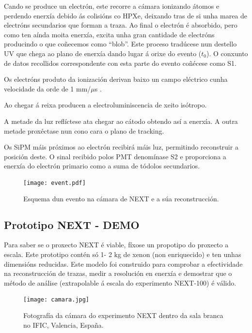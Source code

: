 \documentclass[a4paper,12pt]{article}
\begin{document}
\bi
\item Cando se produce un electrón, este recorre a cámara ionizando átomos e perdendo enerxía debido ás colisións co HPXe, deixando tras de si unha marea de electróns secundarios que forman a traza. Ao final o electrón é absorbido, pero como ten aínda moita enerxía, excita unha gran cantidade de electróns producindo o que coñecemos como ``blob''. Este proceso tradúcese nun destello UV que chega ao plano de enerxía dando lugar á orixe do evento ($t_0$). O conxunto de datos recollidos correspondente con esta parte do evento coñécese como S1.
\item Os electróns produto da ionización derivan baixo un campo eléctrico cunha velocidade da orde de 1 mm/$\mu$s .
\item Ao chegar á reixa producen a electroluminiscencia de xeito isótropo.
\item A metade da luz reflíctese ata chegar ao cátodo obtendo así a enerxía. A outra metade proxéctase nun cono cara o plano de tracking.
\item Os SiPM máis próximos ao electrón recibirá máis luz, permitindo reconstruir a posición deste. O sinal recibido polos PMT  denomínase S2 e proporciona a enerxía do electrón primario como a suma de tódolos secundarios.
\ei
\begin{figure}[!]
\centering
\texttt{[image: event.pdf]}
\caption{Esquema dun evento na cámara de NEXT e a súa reconstrucción.}
\label{event}
\end{figure}

\subsection{Prototipo NEXT - DEMO}\label{NEXTDEMO}

Para saber se o proxecto NEXT é viable, fíxose un propotipo do proxecto a escala. Este prototipo contén só 1- 2 kg de xenon (non enriquecido) e ten unhas dimensións reducidas. Este modelo foi construido para comprobar a efectividade na reconstrucción de trazas, medir a resolución en enerxía e demostrar que o método de análise (extrapolable á escala do experimento NEXT-100) é válido. 

\begin{figure}[!]
\centering
\texttt{[image: camara.jpg]}
\caption{Fotografía da cámara do experimento NEXT dentro da sala branca no IFIC, Valencia, España.}
\label{camara}
\end{figure}
\end{document}
